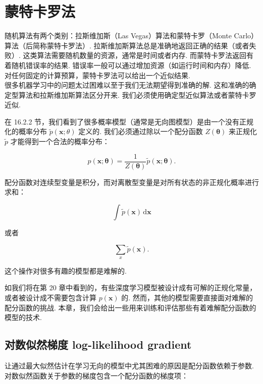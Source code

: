 \chapter{蒙特卡罗法}
\label{ch:monte_carlo}
随机算法有两个类别：拉斯维加斯（Las Vegas）算法和蒙特卡罗（Monte Carlo）算法（后简称蒙特卡罗法）. 拉斯维加斯算法总是准确地返回正确的结果（或者失败）. 这类算法需要随机数量的资源，通常是时间或者内存. 
而蒙特卡罗法返回有着随机错误率的结果. 错误率一般可以通过增加资源（如运行时间和内存）降低. 对任何固定的计算预算，蒙特卡罗法可以给出一个近似结果. \\

很多机器学习中的问题太过困难以至于我们无法期望得到准确的解. 这和准确的确定型算法和拉斯维加斯算法区分开来. 我们必须使用确定型近似算法或者蒙特卡罗近似. 




在 16.2.2 节，我们看到了很多概率模型（通常是无向图模型）是由一个没有正规化的概率分布 $\tilde{p}(\mathbf{x};\theta)$ 定义的. 我们必须通过除以一个配分函数 $Z(\pmb{\theta})$ 来正规化 $\tilde{p}$ 才能得到一个合法的概率分布：

\begin{equation}  \label{eq:pyth}
p(\mathbf{x};\pmb{\theta}) = \frac{1}{Z(\pmb{\theta})} \tilde{p}(\mathbf{x}; \pmb{\theta}).
\end{equation}

配分函数对连续型变量是积分，而对离散型变量是对所有状态的非正规化概率进行求和：

\begin{equation}  \label{eq:pyth}
\int \!\tilde{p}(\pmb{x})\, \mathrm{d}\pmb{x}
\end{equation}

或者

\begin{equation}  \label{eq:pyth}
\sum_{x} \tilde{p}(\pmb{x}).
\end{equation}

这个操作对很多有趣的模型都是难解的. 

如我们将在第 20 章中看到的，有些深度学习模型被设计成有可解的正规化常量，或者被设计成不需要包含计算 $p(\mathbf{x})$ 的. 然而，其他的模型需要直接面对难解的配分函数的挑战. 本章，我们会给出一些用来训练和评估那些有着难解配分函数的模型的技术. 

\section{对数似然梯度 log-likelihood gradient}
\label{sec:llg}

让通过最大似然估计在学习无向的模型中尤其困难的原因是配分函数依赖于参数. 对数似然函数关于参数的梯度包含一个配分函数的梯度项：

